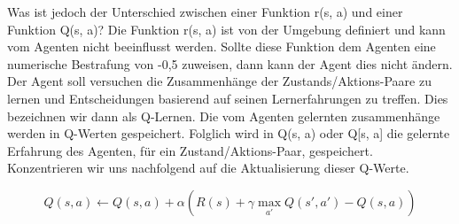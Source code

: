 Was ist jedoch der Unterschied zwischen einer Funktion r(s, a) und einer Funktion Q(s, a)? Die Funktion r(s, a) ist von der Umgebung definiert und kann vom Agenten nicht beeinflusst werden. Sollte diese Funktion dem Agenten eine numerische Bestrafung von -0,5 zuweisen, dann kann der Agent dies nicht ändern. Der Agent soll versuchen die Zusammenhänge der Zustands/Aktions-Paare zu lernen und Entscheidungen basierend auf seinen Lernerfahrungen zu treffen. Dies bezeichnen wir dann als Q-Lernen. Die vom Agenten gelernten zusammenhänge werden in Q-Werten gespeichert. Folglich wird in Q(s, a) oder Q[s, a] die gelernte Erfahrung des Agenten, für ein Zustand/Aktions-Paar, gespeichert. \\

Konzentrieren wir uns nachfolgend auf die Aktualisierung dieser Q-Werte.

\begin{equation} \label{eq:TD-Q-Aktualisierungsgleichung}
Q(s,a) \leftarrow Q(s,a) + \alpha(R(s) + \gamma \max_{a'} Q(s', a') - Q(s,a))
\end{equation}


